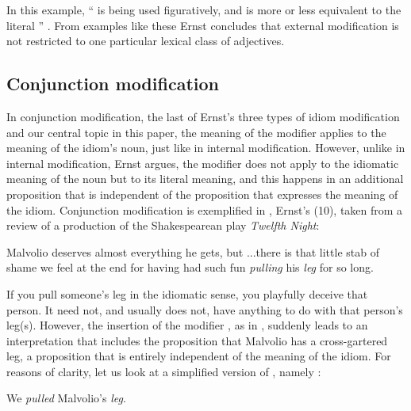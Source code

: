 \documentclass[output=paper]{langsci/langscibook}
\begin{document}
\noindent In this example, ``\underline{} is being used figuratively, and is more or less equivalent to the literal \underline{}'' \citep[55]{ernst81}. From examples like these Ernst concludes that external modification is not restricted to one particular lexical class of adjectives.



\subsection{Conjunction modification} \label{ConjMod}

In conjunction modification, the last of Ernst's three types of idiom modification and our central topic in this paper, the meaning of the modifier applies to the meaning of the idiom's noun, just like in internal modification. However, unlike in internal modification, Ernst argues, the modifier does not apply to the idiomatic meaning of the noun but to its literal meaning, and this happens in an additional proposition that is independent of the proposition that expresses the meaning of the idiom. Conjunction modification is exemplified in , Ernst's (10), taken from a review of a production of the Shakespearean play \textit{Twelfth Night}:

\ea \label{cross-gartered leg}
Malvolio deserves almost everything he gets, but ...\@ there is that little stab of shame we feel at the end for having had such fun \textit{pulling} his \underline{}\underline{} \textit{leg} for so long.
\z

\noindent If you pull someone's leg in the idiomatic sense, you playfully deceive that person. It need not, and usually does not, have anything to do with that person's leg(s). However, the insertion of the modifier \underline{}, as in , suddenly leads to an interpretation that includes the proposition that Malvolio has a cross-gartered leg, a proposition that is entirely independent of the meaning of the idiom. For reasons of clarity, let us look at a simplified version of , namely : 

\ea \label{cross-gartered leg -- simple}
We \textit{pulled} Malvolio's \underline{} \textit{leg}.
\z
\end{document}
